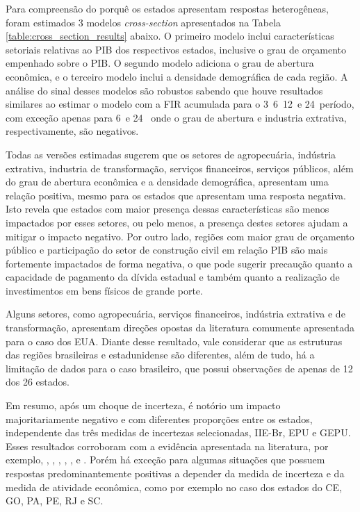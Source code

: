 Para compreensão do porquê os estados apresentam respostas heterogêneas, foram estimados 3 modelos \textit{cross-section} apresentados na Tabela \ref{table:cross_section_results} abaixo. O primeiro modelo inclui características setoriais relativas ao \gls{PIB} dos respectivos estados, inclusive o grau de orçamento empenhado sobre o \gls{PIB}. O segundo modelo adiciona o grau de abertura econômica, e o terceiro modelo inclui a densidade demográfica de cada região. A análise do sinal desses modelos são robustos sabendo que houve resultados similares ao estimar o modelo com a \gls{FIR} acumulada para o 3\textordmasculine\, 6\textordmasculine\, 12\textordmasculine\ e 24\textordmasculine\ período, com exceção apenas para 6\textordmasculine\ e 24 \textordmasculine\ onde o grau de abertura e industria extrativa, respectivamente, são negativos.
\par

Todas as versões estimadas sugerem que os setores de agropecuária, indústria extrativa, industria de transformação, serviços financeiros, serviços públicos, além do grau de abertura econômica e a densidade demográfica, apresentam uma relação positiva, mesmo para os estados que apresentam uma resposta negativa. Isto revela que estados com maior presença dessas características são menos impactados por esses setores, ou pelo menos, a presença destes setores ajudam a mitigar o impacto negativo. Por outro lado, regiões com maior grau de orçamento público e participação do setor de construção civil em relação \gls{PIB} são mais fortemente impactados de forma negativa, o que pode sugerir precaução quanto a capacidade de pagamento da dívida estadual e também quanto a realização de investimentos em bens físicos de grande porte.
\par

Alguns setores, como agropecuária, serviços financeiros, indústria extrativa e de transformação, apresentam direções opostas da literatura comumente apresentada para o caso dos \gls{EUA}. Diante desse resultado, vale considerar que as estruturas das regiões brasileiras e estadunidense são diferentes, além de tudo, há a limitação de dados para o caso brasileiro, que possui observações de apenas de 12 dos 26 estados.
\par

Em resumo, após um choque de incerteza, é notório um impacto majoritariamente negativo e com diferentes proporções entre os estados, independente das três medidas de incertezas selecionadas, \gls{IIE-Br}, \gls{EPU} e \gls{GEPU}. Esses resultados corroboram com a evidência apresentada na literatura, por exemplo, , ,  , , ,  e .
Porém há exceção para algumas situações que possuem respostas predominantemente positivas a depender da medida de incerteza e da medida de atividade econômica, como por exemplo no caso dos estados do \gls{CE}, \gls{GO}, \gls{PA}, \gls{PE}, \gls{RJ} e \gls{SC}. 
\par

